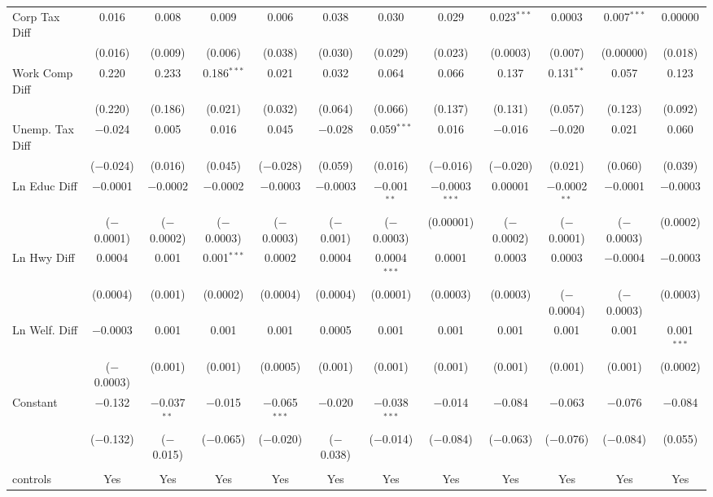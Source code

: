 \begin{table}[!htbp]
\begin{tabular}{@{\extracolsep{5pt}}lccccccccccc}
  Corp Tax Diff & 0.016 & 0.008 & 0.009 & 0.006 & 0.038 & 0.030 & 0.029 & 0.023$^{***}$ & 0.0003 & 0.007$^{***}$ & 0.00000 \\ 
  & (0.016) & (0.009) & (0.006) & (0.038) & (0.030) & (0.029) & (0.023) & (0.0003) & (0.007) & (0.00000) & (0.018) \\ 
  Work Comp Diff & 0.220 & 0.233 & 0.186$^{***}$ & 0.021 & 0.032 & 0.064 & 0.066 & 0.137 & 0.131$^{**}$ & 0.057 & 0.123 \\ 
  & (0.220) & (0.186) & (0.021) & (0.032) & (0.064) & (0.066) & (0.137) & (0.131) & (0.057) & (0.123) & (0.092) \\ 
  Unemp. Tax Diff & $-$0.024 & 0.005 & 0.016 & 0.045 & $-$0.028 & 0.059$^{***}$ & 0.016 & $-$0.016 & $-$0.020 & 0.021 & 0.060 \\ 
  & ($-$0.024) & (0.016) & (0.045) & ($-$0.028) & (0.059) & (0.016) & ($-$0.016) & ($-$0.020) & (0.021) & (0.060) & (0.039) \\ 
  Ln Educ Diff & $-$0.0001 & $-$0.0002 & $-$0.0002 & $-$0.0003 & $-$0.0003 & $-$0.001$^{**}$ & $-$0.0003$^{***}$ & 0.00001 & $-$0.0002$^{**}$ & $-$0.0001 & $-$0.0003 \\ 
  & ($-$0.0001) & ($-$0.0002) & ($-$0.0003) & ($-$0.0003) & ($-$0.001) & ($-$0.0003) & (0.00001) & ($-$0.0002) & ($-$0.0001) & ($-$0.0003) & (0.0002) \\ 
  Ln Hwy Diff & 0.0004 & 0.001 & 0.001$^{***}$ & 0.0002 & 0.0004 & 0.0004$^{***}$ & 0.0001 & 0.0003 & 0.0003 & $-$0.0004 & $-$0.0003 \\ 
  & (0.0004) & (0.001) & (0.0002) & (0.0004) & (0.0004) & (0.0001) & (0.0003) & (0.0003) & ($-$0.0004) & ($-$0.0003) & (0.0003) \\ 
  Ln Welf. Diff & $-$0.0003 & 0.001 & 0.001 & 0.001 & 0.0005 & 0.001 & 0.001 & 0.001 & 0.001 & 0.001 & 0.001$^{***}$ \\ 
  & ($-$0.0003) & (0.001) & (0.001) & (0.0005) & (0.001) & (0.001) & (0.001) & (0.001) & (0.001) & (0.001) & (0.0002) \\ 
  Constant & $-$0.132 & $-$0.037$^{**}$ & $-$0.015 & $-$0.065$^{***}$ & $-$0.020 & $-$0.038$^{***}$ & $-$0.014 & $-$0.084 & $-$0.063 & $-$0.076 & $-$0.084 \\ 
  & ($-$0.132) & ($-$0.015) & ($-$0.065) & ($-$0.020) & ($-$0.038) & ($-$0.014) & ($-$0.084) & ($-$0.063) & ($-$0.076) & ($-$0.084) & (0.055) \\ 
 \hline \\[-1.8ex] 
controls & Yes & Yes & Yes & Yes & Yes & Yes & Yes & Yes & Yes & Yes & Yes \\ 

\end{tabular}
\end{table}
